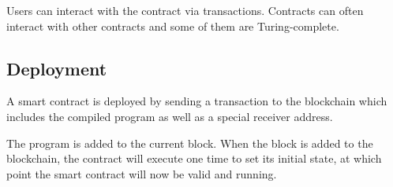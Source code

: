 \documentclass{article}
\begin{document}
Users can interact with the contract via transactions. Contracts can often interact with other contracts
and some of them are Turing-complete.

\subsection{Deployment}

A smart contract is deployed by sending a transaction to the blockchain which includes the compiled program
as well as a special receiver address.

The program is added to the current block. When the block is added to the blockchain, the contract
will execute one time to set its initial state, at which point the smart contract will now be valid and running.
\end{document}

